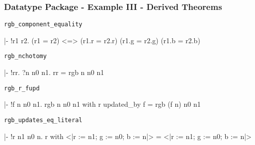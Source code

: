 \begin{frame}[fragile]
\frametitle{Datatype Package - Example III - Derived Theorems}

\begin{block}{\texttt{rgb\_component\_equality}}
\begin{semiverbatim}\scriptsize
|- !r1 r2. (r1 = r2) <=> 
           (r1.r = r2.r) \holAnd{} (r1.g = r2.g) \holAnd{} (r1.b = r2.b)
\end{semiverbatim}
\end{block}

\begin{block}{\texttt{rgb\_nchotomy}}
\begin{semiverbatim}\scriptsize
|- !rr. ?n n0 n1. rr = rgb n n0 n1
\end{semiverbatim}
\end{block}

\begin{block}{\texttt{rgb\_r\_fupd}}
\begin{semiverbatim}\scriptsize
|- !f n n0 n1. rgb n n0 n1 with r updated_by f = rgb (f n) n0 n1
\end{semiverbatim}
\end{block}

\begin{block}{\texttt{rgb\_updates\_eq\_literal}}
\begin{semiverbatim}\scriptsize
|- !r n1 n0 n.
     r with <|r := n1; g := n0; b := n|> = <|r := n1; g := n0; b := n|>
\end{semiverbatim}
\end{block}

\end{frame}


